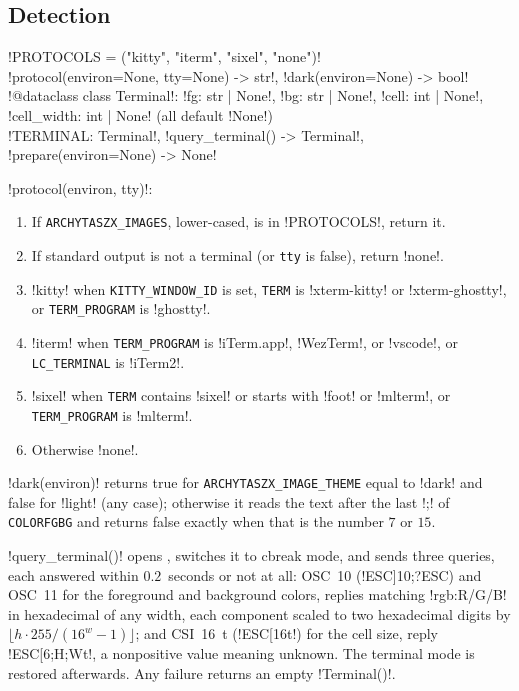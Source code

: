 \subsection{Detection}

\begin{signature}
\code!PROTOCOLS = ("kitty", "iterm", "sixel", "none")!\\
\py!protocol(environ=None, tty=None) -> str!, \py!dark(environ=None) -> bool!\\
\py!@dataclass class Terminal!: \py!fg: str | None!, \py!bg: str | None!, \py!cell: int | None!, \py!cell_width: int | None! (all default \py!None!)\\
\py!TERMINAL: Terminal!, \py!query_terminal() -> Terminal!, \py!prepare(environ=None) -> None!
\end{signature}

\begin{algorithm}\label{alg:shell-protocol}
\leavevmode
\py!protocol(environ, tty)!:
\begin{enumerate}
\item If \texttt{ARCHYTASZX\_IMAGES}, lower-cased, is in \py!PROTOCOLS!, return it.
\item If standard output is not a terminal (or \texttt{tty} is false), return \code!none!.
\item \code!kitty! when \texttt{KITTY\_WINDOW\_ID} is set, \texttt{TERM} is \code!xterm-kitty! or \code!xterm-ghostty!, or \texttt{TERM\_PROGRAM} is \code!ghostty!.
\item \code!iterm! when \texttt{TERM\_PROGRAM} is \code!iTerm.app!, \code!WezTerm!, or \code!vscode!, or \texttt{LC\_TERMINAL} is \code!iTerm2!.
\item \code!sixel! when \texttt{TERM} contains \code!sixel! or starts with \code!foot! or \code!mlterm!, or \texttt{TERM\_PROGRAM} is \code!mlterm!.
\item Otherwise \code!none!.
\end{enumerate}
\end{algorithm}

\py!dark(environ)! returns true for \texttt{ARCHYTASZX\_IMAGE\_THEME} equal to \code!dark! and false for \code!light! (any case); otherwise it reads the text after the last \code!;! of \texttt{COLORFGBG} and returns false exactly when that is the number $7$ or $15$.

\py!query_terminal()! opens , switches it to cbreak mode, and sends three queries, each answered within $0.2$~seconds or not at all: OSC~10 (\code!ESC]10;?ESC\!) and OSC~11 for the foreground and background colors, replies matching \code!rgb:R/G/B! in hexadecimal of any width, each component scaled to two hexadecimal digits by $\lfloor h\cdot255/(16^{w}-1)\rfloor$; and CSI~16~t (\code!ESC[16t!) for the cell size, reply \code!ESC[6;H;Wt!, a nonpositive value meaning unknown. The terminal mode is restored afterwards. Any failure returns an empty \py!Terminal()!.

